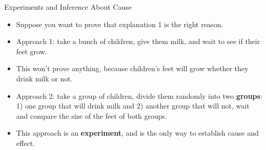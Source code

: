 \documentclass[handout]{beamer}
\begin{document}
\begin{frame}{Experiments and Inference About Cause}
\scriptsize{

\begin{itemize}

 \item Suppose you want to prove that explanation 1 is the right reason.
 \item Approach 1: take a bunch of children, give them milk, and wait to see if their feet grow.
 \item This won't prove anything, because children's feet will grow whether they drink milk or not.
 \item Approach 2: take a group of children, divide them randomly into two \textbf{groups}: 1) one group that will drink milk and 2) another group that will not, wait and compare the size of the feet of both groups. 
 \item This approach is an \textbf{experiment}, and is the only way to establish cause and effect.
 
\end{itemize}



} 
\end{frame}
\end{document}
